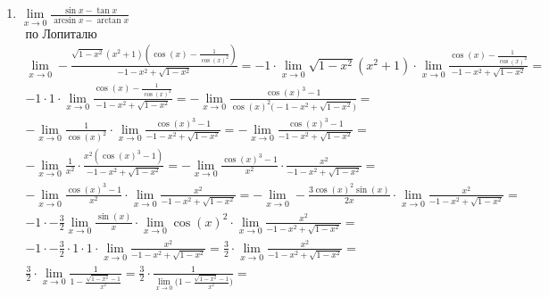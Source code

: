 
		\subsection{}
		\begin{enumerate}
		\item $\lim \limits_{x \to 0} \frac{\sin x - \tan x}{\arcsin x - \arctan x}$
			\begin{gather*}
				\text{по Лопиталю}\\
				\lim \limits_{x \to 0} - \frac{\sqrt{1 - x^2}(x^2 + 1)(\cos(x) - \frac{1}{\cos(x)^2})}{ - 1 - x^2 + \sqrt{1 - x^2}} = 
				 - 1 \cdot \lim \limits_{x \to 0} \sqrt{1 - x^2}(x^2 + 1) \cdot \lim \limits_{x \to 0} \frac{\cos(x) - \frac{1}{\cos(x)^2}}{ - 1 - x^2 + \sqrt{1 - x^2}} = \\
				 - 1 \cdot 1 \cdot \lim \limits_{x \to 0} \frac{\cos(x) - \frac{1}{\cos(x)^2}}{ - 1 - x^2 + \sqrt{1 - x^2}} = 
				 - \lim \limits_{x \to 0} \frac{\cos(x)^3 - 1}{\cos(x)^2 \big( - 1 - x^2 + \sqrt{1 - x^2} \big)} = \\
				 - \lim \limits_{x \to 0} \frac{1}{\cos(x)^2} \cdot \lim \limits_{x \to 0} \frac{\cos(x)^3 - 1}{ - 1 - x^2 + \sqrt{1 - x^2}} = 
				 - \lim \limits_{x \to 0} \frac{\cos(x)^3 - 1}{ - 1 - x^2 + \sqrt{1 - x^2}} = \\
				 - \lim \limits_{x \to 0} \frac{1}{x^2} \cdot \frac{x^2 (\cos(x)^3 - 1)}{ - 1 - x^2 + \sqrt{1 - x^2}} = 
				 - \lim \limits_{x \to 0} \frac{\cos(x)^3 - 1}{x^2} \cdot \frac{x^2}{ - 1 - x^2 + \sqrt{1 - x^2}} = \\
				 - \lim \limits_{x \to 0} \frac{\cos(x)^3 - 1}{x^2} \cdot \lim \limits_{x \to 0} \frac{x^2}{ - 1 - x^2 + \sqrt{1 - x^2}} = 
				 - \lim \limits_{x \to 0} - \frac{3\cos(x)^2\sin(x)}{2x} \cdot \lim \limits_{x \to 0} \frac{x^2}{ - 1 - x^2 + \sqrt{1 - x^2}} = \\
				 - 1 \cdot - \frac{3}{2} \lim \limits_{x \to 0} \frac{\sin(x)}{x} \cdot \lim \limits_{x \to 0} \cos(x)^2 \cdot \lim \limits_{x \to 0} \frac{x^2}{ - 1 - x^2 + \sqrt{1 - x^2}} = \\
				 - 1 \cdot - \frac{3}{2} \cdot 1 \cdot 1 \cdot \lim \limits_{x \to 0} \frac{x^2}{ - 1 - x^2 + \sqrt{1 - x^2}} = 
				\frac{3}{2} \cdot \lim \limits_{x \to 0} \frac{x^2}{ - 1 - x^2 + \sqrt{1 - x^2}} = \\
				\frac{3}{2} \cdot \lim \limits_{x \to 0} \frac{1}{1 - \frac{\sqrt{1 - x^2} - 1}{x^2}} = 
				\frac{3}{2} \cdot \frac{1}{\lim \limits_{x \to 0} \bigg( 1 - \frac{\sqrt{1 - x^2} - 1}{x^2} \bigg)} = 

\end{gather*}
\end{enumerate}
